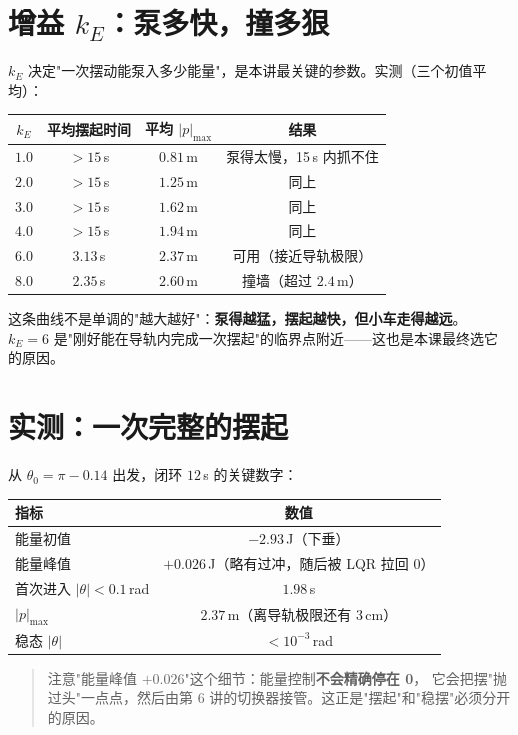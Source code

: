 \section{增益 $k_E$：泵多快，撞多狠}

$k_E$ 决定"一次摆动能泵入多少能量"，是本讲最关键的参数。实测（三个初值平均）：

\begin{center}
\small
\begin{tabular}{@{}cccc@{}}
\toprule
$k_E$ & 平均摆起时间 & 平均 $|p|_{\max}$ & 结果 \\
\midrule
$1.0$ & $>15$\,s & $0.81$\,m & 泵得太慢，15\,s 内抓不住 \\
$2.0$ & $>15$\,s & $1.25$\,m & 同上 \\
$3.0$ & $>15$\,s & $1.62$\,m & 同上 \\
$4.0$ & $>15$\,s & $1.94$\,m & 同上 \\
$6.0$ & $3.13$\,s & $2.37$\,m & 可用（接近导轨极限） \\
$8.0$ & $2.35$\,s & $2.60$\,m & 撞墙（超过 $2.4$\,m） \\
\bottomrule
\end{tabular}
\end{center}

这条曲线不是单调的"越大越好"：\textbf{泵得越猛，摆起越快，但小车走得越远}。
$k_E=6$ 是"刚好能在导轨内完成一次摆起"的临界点附近——这也是本课最终选它的原因。

\section{实测：一次完整的摆起}

从 $\theta_0=\pi-0.14$ 出发，闭环 $12$\,s 的关键数字：

\begin{center}
\small
\begin{tabular}{@{}lc@{}}
\toprule
指标 & 数值 \\
\midrule
能量初值 & $-2.93$\,J（下垂）\\
能量峰值 & $+0.026$\,J（略有过冲，随后被 LQR 拉回 0）\\
首次进入 $|\theta|<0.1$\,rad & $1.98$\,s \\
$|p|_{\max}$ & $2.37$\,m（离导轨极限还有 3\,cm）\\
稳态 $|\theta|$ & $<10^{-3}$\,rad \\
\bottomrule
\end{tabular}
\end{center}

\begin{quote}
注意"能量峰值 $+0.026$"这个细节：能量控制\textbf{不会精确停在 0}，
它会把摆"抛过头"一点点，然后由第 6 讲的切换器接管。这正是"摆起"和"稳摆"必须分开的原因。
\end{quote}

